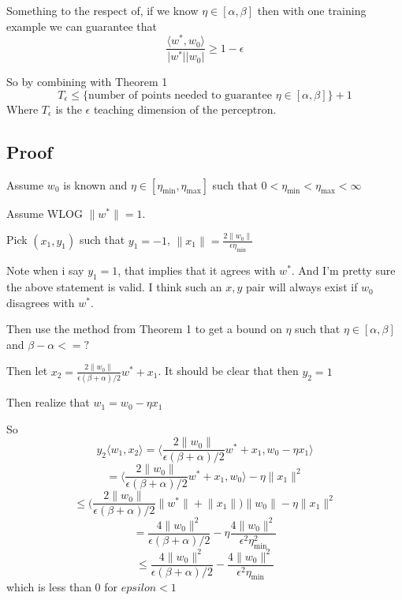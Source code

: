 \documentclass{article}
\begin{document}
Something to the respect of, if we know $\eta \in [\alpha, \beta]$ then with one training example we can guarantee that
$$
\frac{\langle w^*, w_0 \rangle}{\lvert w^* \rvert \lvert w_0 \rvert} \geq 1 - \epsilon
$$

So by combining with Theorem 1
$$
T_\epsilon \leq \{\text{number of points needed to guarantee } \eta \in [\alpha, \beta]\} +1 
$$
Where $T_\epsilon$ is the $\epsilon$ teaching dimension of the perceptron.
\color{black}

\subsection*{Proof}


Assume $w_0$ is known and $\eta \in [\eta_{\min} , \eta_{\max}] $ such that 
$0 < \eta_{\min} < \eta_{\max} < \infty$

Assume WLOG $\lVert w^* \rVert = 1$.

Pick $(x_1,y_1)$ such that $y_1 = -1$, $\lVert x_1 \rVert = \frac{2 \lVert w_0 \rVert}{\epsilon \eta_{\min}}$

\color{red}
Note when i say $y_1 = 1$, that implies that it agrees with $w^*$. And I'm pretty 
sure the above statement is valid. I think such an $x,y$ pair will always exist if
$w_0$ disagrees with $w^*$.
\color{black}

Then use the method from Theorem 1 to get a bound on $\eta$ such that $\eta \in [\alpha , \beta]$ and $\beta - \alpha <= ?$

Then let $x_2 = \frac{2 \lVert w_0 \rVert}{\epsilon (\beta + \alpha)/2}w^* + x_1$.
It should be clear that then $y_2 = 1$

Then realize that
$w_1 = w_0 - \eta x_1$

So
$$
y_2 \langle w_1, x_2 \rangle  = \bigg\langle \frac{2 \lVert w_0 \rVert}{\epsilon (\beta + \alpha) /2} w^* + x_1 , w_0 - \eta x_1 \bigg\rangle
$$
$$
= \bigg\langle \frac{2 \lVert w_0 \rVert}{\epsilon (\beta + \alpha) /2} w^* + x_1 , w_0  \bigg\rangle - \eta \lVert x_1 \rVert^2
$$
$$
\leq \bigg( \frac{2 \lVert w_0 \rVert}{\epsilon (\beta + \alpha) /2} \lVert w^* \rVert + \lVert x_1 \rVert \bigg ) \lVert w_0 \rVert - \eta \lVert x_1 \rVert^2
$$
$$
= \frac{4 \lVert w_0 \rVert^2}{\epsilon (\beta + \alpha)/2} - \eta \frac{4 \lVert w_0 \rVert^2}{\epsilon^2 \eta_{\min}^2}
$$
$$
\leq \frac{4 \lVert w_0 \rVert^2}{\epsilon (\beta + \alpha)/2} -  \frac{4 \lVert w_0 \rVert^2}{\epsilon^2 \eta_{\min}}
$$
which is less than $0$ for $epsilon < 1$
\end{document}
